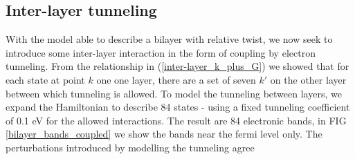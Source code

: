 \documentclass[12pt]{report} %
\begin{document}
\subsection*{Inter-layer tunneling}
With the model able to describe a bilayer with relative twist, we now seek to introduce some inter-layer interaction in the form of coupling by electron tunneling. From the relationship in (\ref{inter-layer_k_plus_G}) we showed that for each state at point $k$ one one layer, there are a set of seven $k'$ on the other layer between which tunneling is allowed. To model the tunneling between layers, we expand the Hamiltonian to describe 84 states - using a fixed tunneling coefficient of 0.1 eV for the allowed interactions. The result are 84 electronic bands, in FIG \ref{bilayer_bands_coupled} we show the bands near the fermi level only. The perturbations introduced by modelling the tunneling agree
\end{document}
